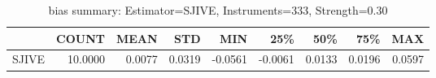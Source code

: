 \begin{table}[ht]
\centering
\caption{bias summary: Estimator=SJIVE, Instruments=333, Strength=0.30}
\begin{tabular}{lrrrrrrrr}
\toprule
 & COUNT & MEAN & STD & MIN & 25\% & 50\% & 75\% & MAX \\
\midrule
SJIVE & 10.0000 & 0.0077 & 0.0319 & -0.0561 & -0.0061 & 0.0133 & 0.0196 & 0.0597 \\
\bottomrule
\end{tabular}
\end{table}
